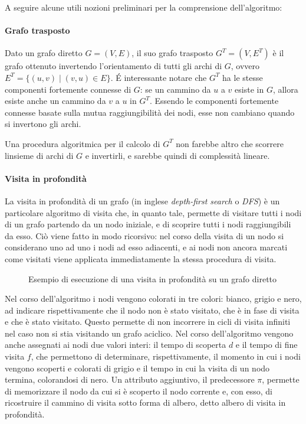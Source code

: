A seguire alcune utili nozioni preliminari per la comprensione dell'algoritmo:

\paragraph{Grafo trasposto}
Dato un grafo diretto $G = (V, E)$, il suo grafo trasposto $G^T = (V, E^T)$ \`e il grafo ottenuto invertendo
l'orientamento di tutti gli archi di $G$, ovvero $E^T = \{(u, v) \mid (v, u) \in E\}$.
 \'E interessante notare che $G^T$ ha le stesse componenti fortemente connesse di $G$: se un cammino da $u$ a $v$
esiste in $G$, allora esiste anche un cammino da $v$ a $u$ in $G^T$.
Essendo le componenti fortemente connesse basate sulla mutua raggiungibilit\`a dei nodi, esse non cambiano
quando si invertono gli archi.

Una procedura algoritmica per il calcolo di $G^T$ non farebbe altro che scorrere linsieme di archi di $G$ e
invertirli, e sarebbe quindi di complessit\`a lineare.

\paragraph{Visita in profondit\`a}
La visita in profondit\`a di un grafo (in inglese \textit{depth-first search} o \textit{DFS}) \`e un particolare
algoritmo di visita che, in quanto tale, permette di visitare tutti i nodi di un grafo partendo da un nodo iniziale,
e di scoprire tutti i nodi raggiungibili da esso.
Ci\`o viene fatto in modo ricorsivo: nel corso della visita di un nodo si considerano uno ad uno i nodi ad esso
adiacenti, e ai nodi non ancora marcati come visitati viene applicata immediatamente la stessa procedura di visita.




\begin{figure}
    
    \caption{Esempio di esecuzione di una visita in profondit\`a su un grafo diretto}
    \label{fig:dfs-example}
\end{figure}

Nel corso dell'algoritmo i nodi vengono colorati in tre colori: bianco, grigio e nero, ad indicare rispettivamente
che il nodo non \`e stato visitato, che \`e in fase di visita e che \`e stato visitato.
Questo permette di non incorrere in cicli di visita infiniti nel caso non si stia visitando un grafo aciclico.
Nel corso dell'algoritmo vengono anche assegnati ai nodi due valori interi: il tempo di scoperta $d$ e il tempo di
fine visita $f$, che permettono di determinare, rispettivamente, il momento in cui i nodi vengono scoperti e colorati
di grigio e il tempo in cui la visita di un nodo termina, colorandosi di nero.
Un attributo aggiuntivo, il predecessore $\pi$, permette di memorizzare il nodo da cui si \`e scoperto il nodo
corrente e, con esso, di ricostruire il cammino di visita sotto forma di albero, detto albero di visita in profondit\`a.
\newline

